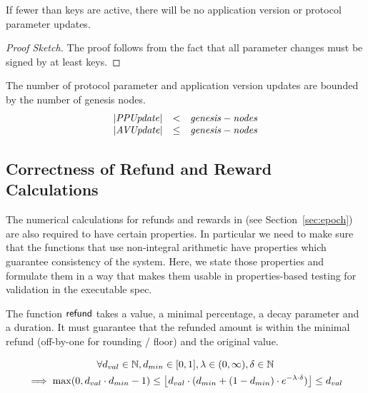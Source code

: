 \begin{property}
  If fewer than  keys are active, there will be no application version or protocol parameter updates.
\end{property}

\begin{proof}[Proof Sketch]
  The proof follows from the fact that all parameter changes must be signed by at least  keys.
\end{proof}


\begin{property}
  The number of protocol parameter and application version updates are bounded by the number of genesis nodes.
  $$
  \begin{array}{lcl}
    | \var{PPUpdate} | & < & \var{genesis-nodes} \\
    | \var{AVUpdate} | & \le & \var{genesis-nodes}
  \end{array}
  $$
\end{property}


\clearpage
\subsection{Correctness of Refund and Reward Calculations}
\label{sec:prop-numer-calc}

The numerical calculations for refunds and rewards in
(see Section~\ref{sec:epoch}) are also required to have certain properties. In
particular we need to make sure that the functions that use non-integral
arithmetic have properties which guarantee consistency of the system. Here, we
state those properties and formulate them in a way that makes them usable in
properties-based testing for validation in the executable spec.

\begin{property}
  \label{prop:minimal-refund}

  The function $\fun{refund}$ takes a value, a minimal percentage, a decay
  parameter and a duration. It must guarantee that the refunded amount is within
  the minimal refund (off-by-one for rounding / floor) and the original value.

  \begin{multline*}
    \forall d_{val} \in \mathbb{N}, d_{min} \in [0,1], \lambda \in (0, \infty),
    \delta \in \mathbb{N} \\
    \implies \max(0,d_{val}\cdot d_{min} - 1) \leq \floor*{d_{val}\cdot(d_{min} +
      (1-d_{min})\cdot e^{-\lambda\cdot\delta})} \leq d_{val}
  \end{multline*}
\end{property}

